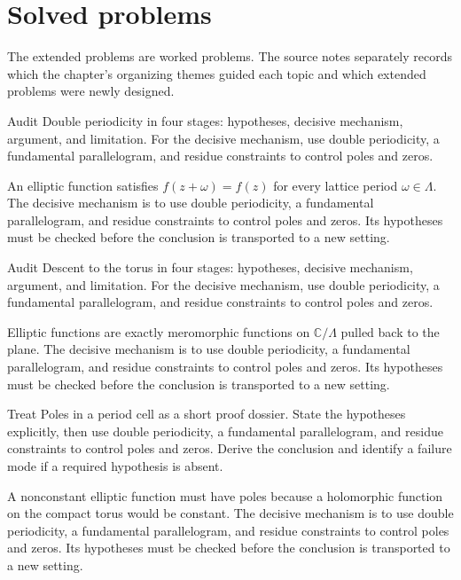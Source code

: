 \section{Solved problems}
The extended problems are worked problems. The source notes separately records which the chapter's organizing themes guided each topic and which extended problems were newly designed.

\begin{problem}\label{prob:iv28-problem-01}
Audit Double periodicity in four stages: hypotheses, decisive mechanism, argument, and limitation. For the decisive mechanism, use double periodicity, a fundamental parallelogram, and residue constraints to control poles and zeros.
\end{problem}
\begin{solution}
An elliptic function satisfies $f(z+\omega)=f(z)$ for every lattice period $\omega\in\Lambda$. The decisive mechanism is to use double periodicity, a fundamental parallelogram, and residue constraints to control poles and zeros. Its hypotheses must be checked before the conclusion is transported to a new setting.
\end{solution}

\begin{problem}\label{prob:iv28-problem-02}
Audit Descent to the torus in four stages: hypotheses, decisive mechanism, argument, and limitation. For the decisive mechanism, use double periodicity, a fundamental parallelogram, and residue constraints to control poles and zeros.
\end{problem}
\begin{solution}
Elliptic functions are exactly meromorphic functions on $\mathbb C/\Lambda$ pulled back to the plane. The decisive mechanism is to use double periodicity, a fundamental parallelogram, and residue constraints to control poles and zeros. Its hypotheses must be checked before the conclusion is transported to a new setting.
\end{solution}

\begin{problem}\label{prob:iv28-problem-03}
Treat Poles in a period cell as a short proof dossier. State the hypotheses explicitly, then use double periodicity, a fundamental parallelogram, and residue constraints to control poles and zeros. Derive the conclusion and identify a failure mode if a required hypothesis is absent.
\end{problem}
\begin{solution}
A nonconstant elliptic function must have poles because a holomorphic function on the compact torus would be constant. The decisive mechanism is to use double periodicity, a fundamental parallelogram, and residue constraints to control poles and zeros. Its hypotheses must be checked before the conclusion is transported to a new setting.
\end{solution}

